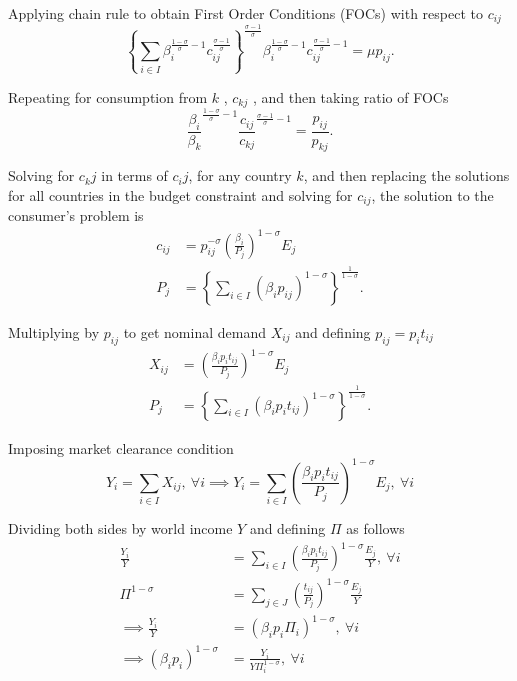 \documentclass[12pt,reqno,oneside,pdftex]{formato-puc/puctesis} %
\begin{document}
Applying chain rule to obtain First Order Conditions (FOCs) with respect
to \(c_{ij}\) \begin{equation*}
\left\{ \sum_{i\in I} \beta_i^{\frac{1 - \sigma}{\sigma} - 1} c_{ij}^{\frac{\sigma - 1}{\sigma}} \right\}^{\frac{\sigma - 1}{\sigma}} \beta_i^{\frac{1 - \sigma}{\sigma} - 1} c_{ij}^{\frac{\sigma - 1}{\sigma} - 1} = \mu p_{ij}.
\end{equation*}

Repeating for consumption from \(k\) , \(c_{kj}\) , and then taking
ratio of FOCs \begin{equation*}
\frac{\beta_i}{\beta_k}^{\frac{1 - \sigma}{\sigma} - 1} \frac{c_{ij}}{c_{kj}}^{\frac{\sigma - 1}{\sigma} - 1} = \frac{p_{ij}}{p_{kj}}.
\end{equation*}

Solving for \(c_kj\) in terms of \(c_ij\), for any country \(k\), and
then replacing the solutions for all countries in the budget constraint
and solving for \(c_{ij}\), the solution to the consumer's problem is
\begin{align*}
c_{ij} &= p_{ij}^{-\sigma} \left( \frac{\beta_i}{P_j} \right)^{1 - \sigma} E_j \\
P_j &= \left\{\sum_{i \in I} (\beta_i p_{ij})^{1 - \sigma} \right\}^{\frac{1}{1 - \sigma}}.
\end{align*}

Multiplying by \(p_{ij}\) to get nominal demand \(X_{ij}\) and defining
\(p_{ij} = p_i t_{ij}\) \begin{align*}
X_{ij} &= \left( \frac{\beta_i p_i t_{ij}}{P_j} \right)^{1 - \sigma} E_j \\
P_j &= \left\{\sum_{i \in I} (\beta_i p_{i} t_{ij})^{1 - \sigma} \right\}^{\frac{1}{1 - \sigma}}.
\end{align*}

Imposing market clearance condition \begin{equation*}
Y_i = \sum_{i \in I} X_{ij},\: \forall i \implies Y_i = \sum_{i \in I} \left( \frac{\beta_i p_i t_{ij}}{P_j} \right)^{1 - \sigma} E_j,\: \forall i
\end{equation*}

Dividing both sides by world income \(Y\) and defining \(\Pi\) as
follows \begin{align*}
\frac{Y_i}{Y} &= \sum_{i \in I} \left( \frac{\beta_i p_i t_{ij}}{P_j} \right)^{1 - \sigma} \frac{E_j}{Y},\: \forall i \\
\Pi^{1 - \sigma} &= \sum_{j \in J} \left(\frac{t_{ij}}{P_j}\right)^{1 - \sigma} \frac{E_j}{Y} \\
\implies \frac{Y_i}{Y} &= (\beta_i p_i \Pi_i)^{1 - \sigma},\: \forall i \\
\implies (\beta_i p_i)^{1 - \sigma} &= \frac{Y_i}{Y \Pi_i^{1 - \sigma}},\: \forall i
\end{align*}
\end{document}
